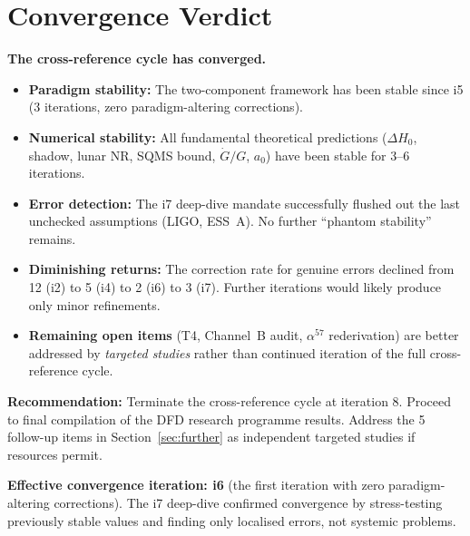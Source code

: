 \documentclass[11pt]{article}
\begin{document}
\section{Convergence Verdict}
\label{sec:verdict}

\begin{tcolorbox}[colback=green!5!white, colframe=green!60!black,
  title=\textbf{CONVERGENCE VERDICT}]

\textbf{The cross-reference cycle has converged.}

\begin{itemize}[nosep]
\item \textbf{Paradigm stability:} The two-component framework has been
  stable since i5 (3 iterations, zero paradigm-altering corrections).
\item \textbf{Numerical stability:} All fundamental theoretical predictions
  ($\Delta H_0$, shadow, lunar NR, SQMS bound, $\dot{G}/G$, $a_0$) have
  been stable for 3--6 iterations.
\item \textbf{Error detection:} The i7 deep-dive mandate successfully
  flushed out the last unchecked assumptions (LIGO, ESS~A). No further
  ``phantom stability'' remains.
\item \textbf{Diminishing returns:} The correction rate for genuine errors
  declined from 12 (i2) to 5 (i4) to 2 (i6) to 3 (i7). Further iterations
  would likely produce only minor refinements.
\item \textbf{Remaining open items} (T4, Channel~B audit, $\alpha^{57}$
  rederivation) are better addressed by \emph{targeted studies} rather
  than continued iteration of the full cross-reference cycle.
\end{itemize}

\textbf{Recommendation:} Terminate the cross-reference cycle at iteration 8.
Proceed to final compilation of the DFD research programme results. Address
the 5 follow-up items in Section~\ref{sec:further} as independent targeted
studies if resources permit.

\textbf{Effective convergence iteration: i6} (the first iteration with zero
paradigm-altering corrections). The i7 deep-dive confirmed convergence by
stress-testing previously stable values and finding only localised errors,
not systemic problems.
\end{tcolorbox}


\end{document}
